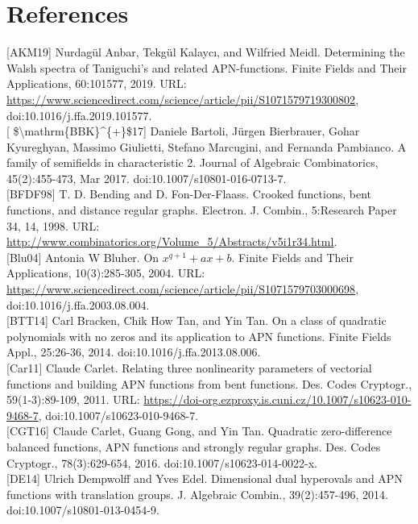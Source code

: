\documentclass[10pt]{article}
\begin{document}
\section*{References}
[AKM19] Nurdagül Anbar, Tekgül Kalaycı, and Wilfried Meidl. Determining the Walsh spectra of Taniguchi's and related APN-functions. Finite Fields and Their Applications, 60:101577, 2019. URL: \href{https://www.sciencedirect.com/science/article/pii/S1071579719300802}{https://www.sciencedirect.com/science/article/pii/S1071579719300802}, doi:10.1016/j.ffa.2019.101577.\\[0pt]
[ \$\textbackslash mathrm\{BBK\}\^{}\{+\}\$17] Daniele Bartoli, Jürgen Bierbrauer, Gohar Kyureghyan, Massimo Giulietti, Stefano Marcugini, and Fernanda Pambianco. A family of semifields in characteristic 2. Journal of Algebraic Combinatorics, 45(2):455-473, Mar 2017. doi:10.1007/s10801-016-0713-7.\\[0pt]
[BFDF98] T. D. Bending and D. Fon-Der-Flaass. Crooked functions, bent functions, and distance regular graphs. Electron. J. Combin., 5:Research Paper 34, 14, 1998. URL: \href{http://www.combinatorics.org/Volume_5/Abstracts/v5i1r34.html}{http://www.combinatorics.org/Volume\_5/Abstracts/v5i1r34.html}.\\[0pt]
[Blu04] Antonia W Bluher. On $x^{q+1}+a x+b$. Finite Fields and Their Applications, 10(3):285-305, 2004. URL: \href{https://www.sciencedirect.com/science/article/pii/S1071579703000698}{https://www.sciencedirect.com/science/article/pii/S1071579703000698}, doi:10.1016/j.ffa.2003.08.004.\\[0pt]
[BTT14] Carl Bracken, Chik How Tan, and Yin Tan. On a class of quadratic polynomials with no zeros and its application to APN functions. Finite Fields Appl., 25:26-36, 2014. doi:10.1016/j.ffa.2013.08.006.\\[0pt]
[Car11] Claude Carlet. Relating three nonlinearity parameters of vectorial functions and building APN functions from bent functions. Des. Codes Cryptogr., 59(1-3):89-109, 2011. URL: \href{https://doi-org.ezproxy.is.cuni.cz/10.1007/s10623-010-9468-7}{https://doi-org.ezproxy.is.cuni.cz/10.1007/s10623-010-9468-7}, doi:10.1007/s10623-010-9468-7.\\[0pt]
[CGT16] Claude Carlet, Guang Gong, and Yin Tan. Quadratic zero-difference balanced functions, APN functions and strongly regular graphs. Des. Codes Cryptogr., 78(3):629-654, 2016. doi:10.1007/s10623-014-0022-x.\\[0pt]
[DE14] Ulrich Dempwolff and Yves Edel. Dimensional dual hyperovals and APN functions with translation groups. J. Algebraic Combin., 39(2):457-496, 2014. doi:10.1007/s10801-013-0454-9.\\[0pt]
\end{document}
